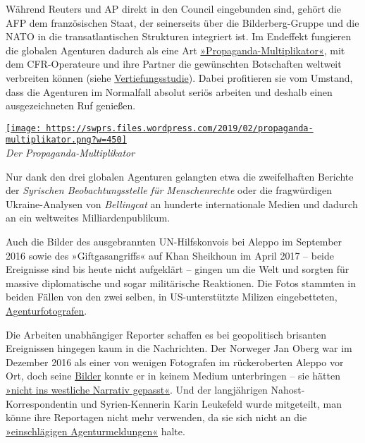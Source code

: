 Während Reuters und AP direkt in den Council eingebunden sind, gehört
die AFP dem französischen Staat, der seinerseits über die
Bilderberg-Gruppe und die NATO in die transatlantischen Strukturen
integriert ist. Im Endeffekt fungieren die globalen Agenturen dadurch
als eine Art
\href{https://swprs.org/der-propaganda-multiplikator/}{»Propaganda-Multiplikator«},
mit dem CFR-Operateure und ihre Partner die gewünschten Botschaften
weltweit verbreiten können (siehe
\href{https://swprs.org/der-propaganda-multiplikator/}{Vertiefungsstudie}).
Dabei profitieren sie vom Umstand, dass die Agenturen im Normalfall
absolut seriös arbeiten und deshalb einen ausgezeichneten Ruf genießen.

\href{https://swprs.files.wordpress.com/2019/02/propaganda-multiplikator.png}{\texttt{[image: https://swprs.files.wordpress.com/2019/02/propaganda-multiplikator.png?w=450]}}\\
\emph{Der Propaganda-Multiplikator}

Nur dank den drei globalen Agenturen gelangten etwa die zweifelhaften
Berichte der \emph{Syrischen Beobachtungsstelle für Menschenrechte} oder
die fragwürdigen Ukraine-Analysen von \emph{Bellingcat} an hunderte
internationale Medien und dadurch an ein weltweites Milliardenpublikum.

Auch die Bilder des ausgebrannten UN-Hilfskonvois bei Aleppo im
September 2016 sowie des »Giftgasangriffs« auf Khan Sheikhoun im April
2017 -- beide Ereignisse sind bis heute nicht aufgeklärt -- gingen um
die Welt und sorgten für massive diplomatische und sogar militärische
Reaktionen. Die Fotos stammten in beiden Fällen von den zwei selben, in
US-unterstützte Milizen eingebetteten,
\href{https://de.sputniknews.com/blogs/20170507315669095-reuters-afp-getty-vermarkten-fake-syrien/}{Agenturfotografen}.

Die Arbeiten unabhängiger Reporter schaffen es bei geopolitisch
brisanten Ereignissen hingegen kaum in die Nachrichten. Der Norweger Jan
Oberg war im Dezember 2016 als einer von wenigen Fotografen im
rückeroberten Aleppo vor Ort, doch seine
\href{https://janoberg.exposure.co/}{Bilder} konnte er in keinem Medium
unterbringen -- sie hätten
\href{https://janoberg.exposure.co/humans-in-liberated-aleppo}{»nicht
ins westliche Narrativ gepasst«}. Und der langjährigen
Nahost-Korrespondentin und Syrien-Kennerin Karin Leukefeld wurde
mitgeteilt, man könne ihre Reportagen nicht mehr verwenden, da sie sich
nicht an die
\href{https://www.watson.ch/International/Kommentar/148360008-Spielball-der-M\%C3\%A4chte--Weshalb-der-Syrien-Konflikt-in-erster-Linie-ein-Stellvertreterkrieg-ist}{»einschlägigen
Agentur­meldungen«} halte.

